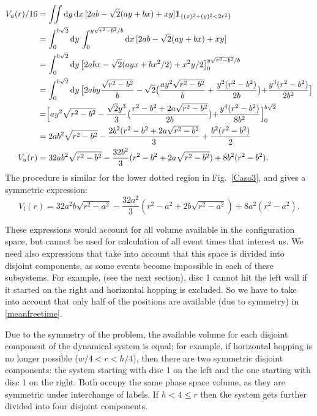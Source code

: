 \documentclass[superscriptaddress,pre,reprint,showpacs,twocolumn]{revtex4-1}
\newcommand{\rd}[1]{\mathrm{d}{#1} \,}
\newcommand{\indicatorsymbol}{\mathbf{1}}
\newcommand{\indicator}[1]{\indicatorsymbol_{ \{   #1 \} } }
\begin{document}
\begin{equation}
  \begin{split}
    V_{u}(r) /16 &=\iint \rd y \rd x [2ab-\sqrt{2}(ay+bx)+xy] \indicator{(x)^2+(y)^2<2r^2 }\\
    &=\int_0^{b\sqrt{2}}\rd y \int_{0}^{y\sqrt{r^2-b^2}/b} \rd x [2ab-\sqrt{2}(ay+bx)+xy] \\
   &=\int_0^{b\sqrt{2}}\rd y \bigl[2abx-\sqrt{2}(ayx+bx^2/2)+x^2y/2\bigr]_{0}^{y\sqrt{r^2-b^2}/b} \\
      &=\int_0^{b\sqrt{2}}\rd y
        \bigr[
          2aby\frac{\sqrt{r^2-b^2}}{b}
          -\sqrt{2}
          \bigr(
          \frac{ay^2\sqrt{r^2-b^2}}{b}
            +\frac{y^2(r^2-b^2)}{2b}
            \bigl)
           +\frac{y^3(r^2-b^2)}{2b^2}
           \bigl]\\
        &= \Bigr[ay^2\sqrt{r^2-b^2}-
          \frac{\sqrt{2}y^3}{3}
          \bigr(
          \frac{r^2-b^2+2a\sqrt{r^2-b^2}}{2b}
            \bigl)
            +\frac{y^4(r^2-b^2)}{8b^2}
            \Bigl]_0^{b\sqrt{2}}\\
          &=2ab^2\sqrt{r^2-b^2}
          -\frac{2b^2(r^2-b^2+2a\sqrt{r^2-b^2}}{3}+\frac{b^2(r^2-b^2)}{2}\\
          V_{u}(r)&=32ab^2\sqrt{r^2-b^2} -\frac{32
            b^2}{3}(r^2-b^2+2a\sqrt{r^2-b^2}) +8b^2(r^2-b^2).
  \end{split}
  \end{equation}
The procedure is similar for the lower dotted  region in Fig.~\ref{Caso3},
and gives a symmetric expression:
\begin{equation}
          V_{l}(r)=32a^2b\sqrt{r^2-a^2} -\frac{32
            a^2}{3}(r^2-a^2+2b\sqrt{r^2-a^2}) +8a^2(r^2-a^2).
\end{equation}

These expressions would account for all volume available in the configuration space, but
cannot be used for calculation of all event times that interest us. We need also
expressions that take into account that this space is divided into disjoint components,
as some events become impossible in each of these subsystems. For example,
(see the next section), disc 1 cannot hit the left wall if
it started on the right and horizontal hopping is excluded. So we have to
take into account that only half of the positions are available (due to symmetry)
 in \eqref{meanfreetime}.

Due to the symmetry of the problem, the available volume
for each disjoint component of the dynamical system is equal; for example, if horizontal hopping is no longer possible
($w/4<r<h/4$), then there are two symmetric disjoint components: the system
starting with disc 1 on the left and the one starting with disc 1 on
the right. Both occupy the same phase space volume, as they are
symmetric under interchange of labels. If $h<4\leq r$ then the system gets further
divided into four disjoint components. 
\end{document}
